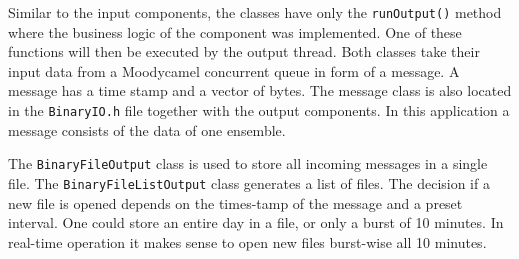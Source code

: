 Similar to the input components, the classes have only the \texttt{runOutput()} method where the business logic of the component was implemented. One of these functions will then be executed by the output thread. Both classes take their input data from a Moodycamel concurrent queue in form of a message. A message has a time stamp and a vector of bytes. The message class is also located in the \texttt{BinaryIO.h} file together with the output components. In this application a message consists of the data of one ensemble.

The \texttt{BinaryFileOutput} class is used to store all incoming messages in a single file. The \texttt{BinaryFileListOutput} class generates a list of files. The decision if a new file is opened depends on the times-tamp of the message and a preset interval. One could store an entire day in a file, or only a burst of 10 minutes. In real-time operation it makes sense to open new files burst-wise all 10 minutes.